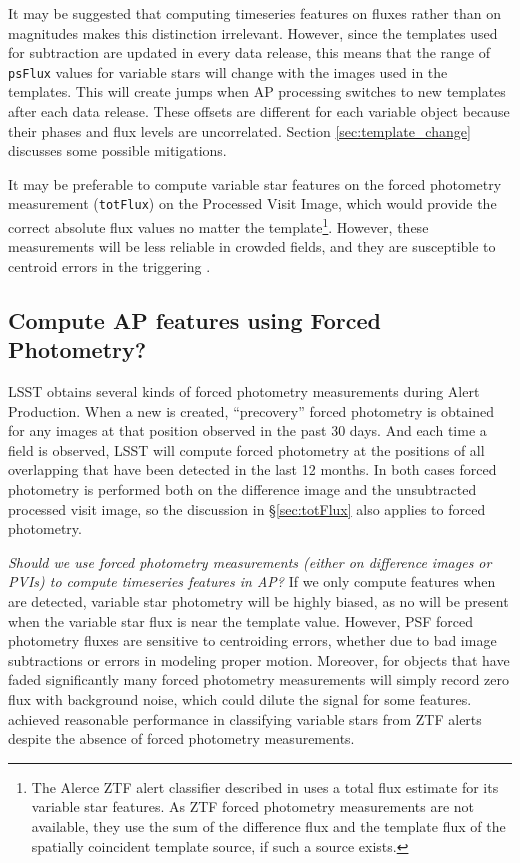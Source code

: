 \documentclass[DM,authoryear,toc]{lsstdoc}
\begin{document}
It may be suggested that computing timeseries features on fluxes rather than on magnitudes makes this distinction irrelevant.
However, since the templates used for subtraction are updated in every data release, this means that the range of \texttt{psFlux} values for variable stars will change with the images used in the templates.
This will create jumps when AP processing switches to new templates after each data release.
These offsets are different for each variable object because their phases and flux levels are uncorrelated.
Section \ref{sec:template_change} discusses some possible mitigations.

It may be preferable to compute variable star features on the forced photometry measurement (\texttt{totFlux}) on the Processed Visit Image, which would provide the correct absolute flux values no matter the template\footnote{The Alerce ZTF alert classifier described in \citet{Sanchez-Saez:21:AlertClassification} uses a total flux estimate for its variable star features.
As ZTF forced photometry measurements are not available, they use the sum of the difference flux and the template flux of the spatially coincident template source, if such a source exists.}.
However, these measurements will be less reliable in crowded fields, and they are susceptible to centroid errors in the triggering \DIASource.


\subsection{Compute AP features using Forced Photometry?}

LSST obtains several kinds of forced photometry measurements during Alert Production.
When a new \DIAObject is created, ``precovery'' forced photometry is obtained for any images at that position observed in the past 30 days.
And each time a field is observed, LSST will compute forced photometry at the positions of all overlapping \DIAObjects that have been detected in the last 12 months.
In both cases forced photometry is performed both on the difference image and the unsubtracted processed visit image, so the discussion in \S \ref{sec:totFlux} also applies to forced photometry.

\textit{Should we use forced photometry measurements (either on difference images or PVIs) to compute timeseries features in AP?}
If we only compute features when \DIASources are detected, variable star photometry will be highly biased, as no \DIASources will be present when the variable star flux is near the template value.
However, PSF forced photometry fluxes are sensitive to centroiding errors, whether due to bad image subtractions or errors in modeling proper motion.
Moreover, for objects that have faded significantly many forced photometry measurements will simply record zero flux with background noise, which could dilute the signal for some features.
\citet{Sanchez-Saez:21:AlertClassification} achieved reasonable performance in classifying variable stars from ZTF alerts despite the absence of forced photometry measurements.
\end{document}
